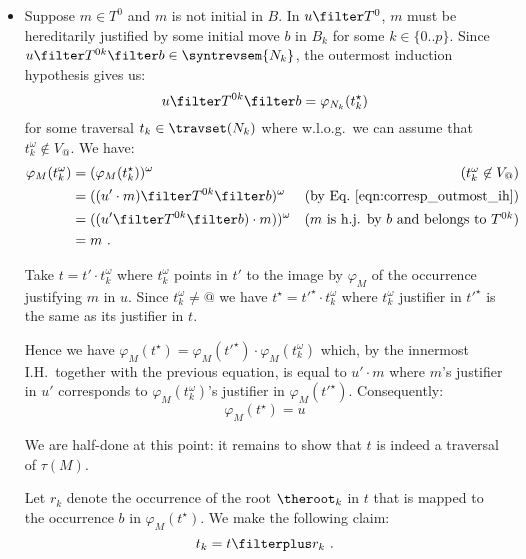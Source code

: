 \begin{itemize}[$\bullet$]
\begin{enumerate}
\begin{itemize}
    \item Suppose $m\in T^0$ and $m$ is not initial in $B$. In $u \filter T^0$, $m$ must be hereditarily justified by some initial move $b$ in $B_k$ for some $k\in \{0..p\}$. Since $u \filter T^{0k} \filter b \in \syntrevsem{N_k}$, the outermost induction hypothesis gives us:
        \begin{equation}
        u \filter T^{0k} \filter b = \varphi_{N_k}(t_k^\star)  \label{eqn:corresp_outmost_ih}
        \end{equation}
        for some traversal $t_k \in \travset(N_k)$ where w.l.o.g.\ we can assume that $t_k^\omega \not\in V_@$. We have:
        \begin{align*}
            \varphi_M (t_k^\omega) &= (\varphi_M (t_k^\star))^\omega & \mbox{($t_k^\omega \not\in V_@$)}\\
                                   &= ((u' \cdot m) \filter T^{0k}\filter b)^\omega & \mbox{(by Eq.\ \ref{eqn:corresp_outmost_ih})}\\
                                   &= ((u' \filter T^{0k}\filter b) \cdot m))^\omega & \mbox{($m$ is h.j. by $b$ and belongs to $T^{0k}$)}\\
                                   &= m \ .
        \end{align*}

        Take $t = t'\cdot t_k^\omega$ where $t_k^\omega$ points in $t'$ to the image by $\varphi_M$ of the occurrence justifying $m$ in $u$. Since $t_k^\omega \neq @$ we have  $t^\star = t'^\star \cdot t_k^\omega$ where $t_k^\omega$ justifier in $t'^\star$ is the same as its justifier in $t$.


        Hence we have $\varphi_{M}(t^\star) =  \varphi_{M}(t'^\star)  \cdot \varphi_{M}(t_k^\omega)$ which, by the innermost I.H.\ together with the previous equation, is equal to $u' \cdot m$ where $m$'s justifier in $u'$ corresponds to $\varphi_{M}(t_k^\omega)$'s justifier in $\varphi_{M}(t'^\star)$. Consequently:
        \begin{equation}
                \varphi_M(t^\star) =  u  \label{eqn:corresp_phi_t_minu_at_eq_u}
        \end{equation}
\smallskip

        We are half-done at this point: it remains to show that $t$ is indeed a traversal of $\tau(M)$.

        Let $r_k$ denote the occurrence of the root
        $\theroot_k$ in $t$ that is mapped to the
        occurrence $b$ in $\varphi_{M}(t^\star)$. We make the following claim:
        \begin{equation}
            t_k = t \filterplus r_k \ . \label{equ:claim_tk}
        \end{equation}


\end{itemize}
\end{enumerate}
\end{itemize}
